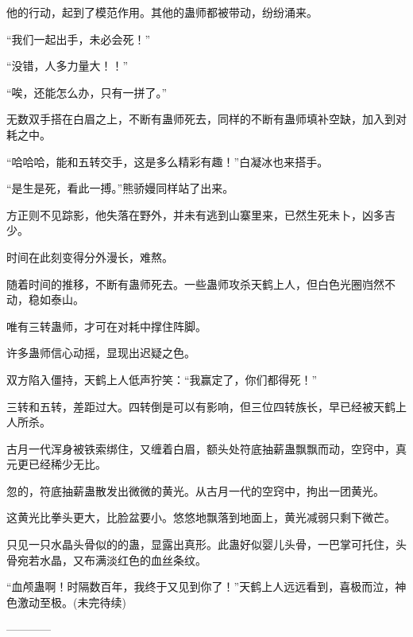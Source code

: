\begin{this_body}
他的行动，起到了模范作用。其他的蛊师都被带动，纷纷涌来。

“我们一起出手，未必会死！”

“没错，人多力量大！！”

“唉，还能怎么办，只有一拼了。”

无数双手搭在白眉之上，不断有蛊师死去，同样的不断有蛊师填补空缺，加入到对耗之中。

“哈哈哈，能和五转交手，这是多么精彩有趣！”白凝冰也来搭手。

“是生是死，看此一搏。”熊骄嫚同样站了出来。

方正则不见踪影，他失落在野外，并未有逃到山寨里来，已然生死未卜，凶多吉少。

时间在此刻变得分外漫长，难熬。

随着时间的推移，不断有蛊师死去。一些蛊师攻杀天鹤上人，但白色光圈岿然不动，稳如泰山。

唯有三转蛊师，才可在对耗中撑住阵脚。

许多蛊师信心动摇，显现出迟疑之色。

双方陷入僵持，天鹤上人低声狞笑：“我赢定了，你们都得死！”

三转和五转，差距过大。四转倒是可以有影响，但三位四转族长，早已经被天鹤上人所杀。

古月一代浑身被铁索绑住，又缠着白眉，额头处符底抽薪蛊飘飘而动，空窍中，真元更已经稀少无比。

忽的，符底抽薪蛊散发出微微的黄光。从古月一代的空窍中，拘出一团黄光。

这黄光比拳头更大，比脸盆要小。悠悠地飘落到地面上，黄光减弱只剩下微芒。

只见一只水晶头骨似的的蛊，显露出真形。此蛊好似婴儿头骨，一巴掌可托住，头骨宛若水晶，又布满淡红色的血丝条纹。

“血颅蛊啊！时隔数百年，我终于又见到你了！”天鹤上人远远看到，喜极而泣，神色激动至极。(未完待续)

------------

\end{this_body}

